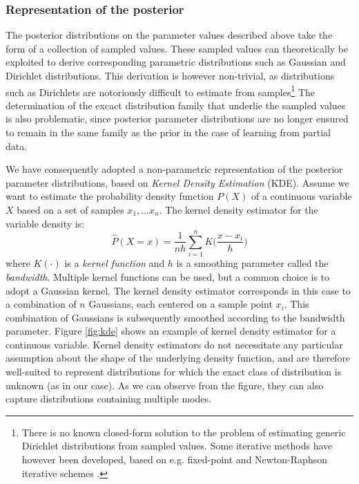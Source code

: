 \subsubsection*{Representation of the posterior}

The posterior distributions on the parameter values described above take the form of a collection of sampled values. These sampled values can theoretically be exploited to derive corresponding parametric distributions such as Gaussian and Dirichlet distributions.  This derivation is however non-trivial, as distributions such as Dirichlets are notoriously difficult to estimate from samples\footnote{There is no known closed-form solution to the problem of estimating generic Dirichlet distributions from sampled values. Some iterative methods have however been developed, based on e.g. fixed-point and Newton-Raphson iterative schemes \citep{minka2003}.} The determination of the excact distribution family that underlie the sampled values is also problematic, since posterior parameter distributions are no longer ensured to remain in the same family as the prior in the case of learning from partial data. 

We have consequently adopted a non-parametric representation of the posterior parameter distributions, based on \textit{Kernel Density Estimation} (KDE).  Assume we want to estimate the probability density function $P(X)$ of a continuous variable $X$ based on a set of samples $x_1, ... x_n$.  The kernel density estimator for the variable density is:
\begin{equation}
\hat{P}(X=x) = \frac{1}{nh} \sum_{i=1}^n K\Big(\frac{x-x_i}{h}\Big) \label{eq:kde}
\end{equation}
where $K(\cdot)$ is a \textit{kernel function} and $h$ is a smoothing parameter called the \textit{bandwidth}. Multiple kernel functions can be used, but a common choice is to adopt a Gaussian kernel. The kernel density estimator corresponds in this case to a combination of $n$ Gaussians, each centered on a sample point $x_i$.  This combination of Gaussians is subsequently smoothed according to the bandwidth parameter. Figure \ref{fig:kde} shows an example of kernel density estimator for a continuous variable. Kernel density estimators do not necessitate any particular assumption about the shape of the underlying density function, and are therefore well-suited to represent distributions for which the exact class of distribution is unknown (as in our case).  As we can observe from the figure, they can also capture distributions containing multiple modes. 

